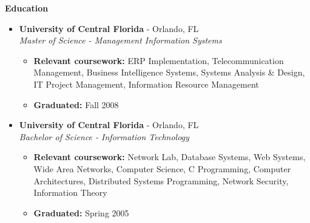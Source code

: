\documentclass[10pt,oneside]{article}
\newenvironment{ressection}[1]{
  \vspace{4pt}
  \textbf{\selectfont\normalsize#1}
  \begin{itemize}
  \vspace{3pt}
}{
  \end{itemize}
}
\newcommand{\ressubitem}[1]{
  \vspace{-1pt}
  \item \begin{flushleft} #1 \end{flushleft}
}
\newcommand{\resbigitem}[3]{
  \vspace{-5pt}
  \item
  \textbf{#1} - #2 \\
  \textit{#3}
}
\newenvironment{ressubsec}[3]{
  \resbigitem{#1}{#2}{#3}
  \vspace{-2pt}
  \begin{itemize}
}{
  \end{itemize}
}
\begin{document}

\begin{ressection}{Education}

  \begin{ressubsec}{University of Central Florida}{Orlando, FL}{Master of Science - Management Information Systems}

    \ressubitem{\textbf{Relevant coursework:} ERP Implementation, Telecommunication Management, Business Intelligence Systems, Systems Analysis \& Design, IT Project Management, Information Resource Management}

    \ressubitem{\textbf{Graduated:} Fall 2008}

  \end{ressubsec}

  \begin{ressubsec}{University of Central Florida}{Orlando, FL}{Bachelor of Science - Information Technology}

    \ressubitem{\textbf{Relevant coursework:} Network Lab, Database Systems, Web Systems, Wide Area Networks, Computer Science, C Programming, Computer Architectures, Distributed Systems Programming, Network Security, Information Theory}

    \ressubitem{\textbf{Graduated:} Spring 2005}

  \end{ressubsec}

\end{ressection}

\end{document}
